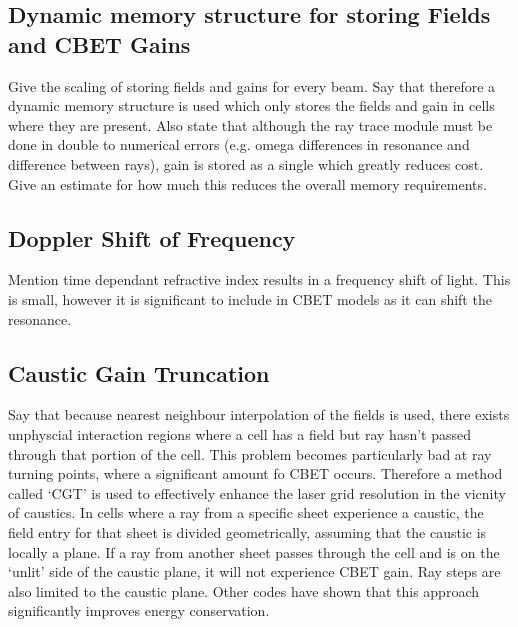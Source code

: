 \subsection{Dynamic memory structure for storing Fields and CBET Gains}

Give the scaling of storing fields and gains for every beam.
Say that therefore a dynamic memory structure is used which only stores the fields and gain in cells where they are present.
Also state that although the ray trace module must be done in double to numerical errors (e.g. omega differences in resonance and difference between rays), gain is stored as a single which greatly reduces cost.
Give an estimate for how much this reduces the overall memory requirements.

\subsection{Doppler Shift of Frequency}

Mention time dependant refractive index results in a frequency shift of light.
This is small, however it is significant to include in CBET models as it can shift the resonance.

\subsection{Caustic Gain Truncation}

Say that because nearest neighbour interpolation of the fields is used, there exists unphyscial interaction regions where a cell has a field but ray hasn't passed through that portion of the cell.
This problem becomes particularly bad at ray turning points, where a significant amount fo CBET occurs.
Therefore a method called `CGT' is used to effectively enhance the laser grid resolution in the vicnity of caustics.
In cells where a ray from a specific sheet experience a caustic, the field entry for that sheet is divided geometrically, assuming that the caustic is locally a plane.
If a ray from another sheet passes through the cell and is on the `unlit' side of the caustic plane, it will not experience CBET gain.
Ray steps are also limited to the caustic plane.
Other codes have shown that this approach significantly improves energy conservation.

